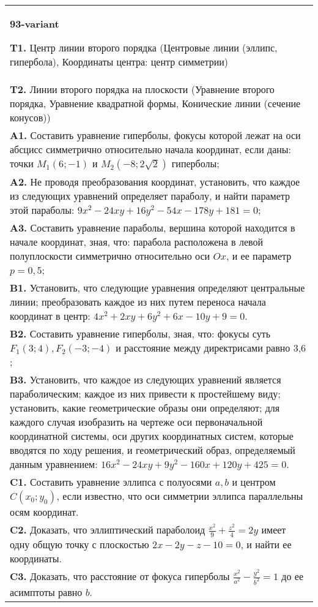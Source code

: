 \documentclass{article}
\begin{document}
\begin{tabular}{m{17cm}}
\textbf{93-variant}
\newline

\textbf{T1.} Центр линии второго порядка (Центровые линии (эллипс, гипербола), Координаты центра: центр симметрии) \\
\textbf{T2.} Линии второго порядка на плоскости (Уравнение второго порядка, Уравнение квадратной формы, Конические линии (сечение конусов)) \\
\textbf{A1.} Составить уравнение гиперболы, фокусы которой лежат на оси абсцисс симметрично относительно начала координат, если даны: точки $M_1(6 ;-1)$ и $M_2(-8 ; 2 \sqrt{2})$ гиперболы; \\
\textbf{A2.} Не проводя преобразования координат, установить, что каждое из следующих уравнений определяет параболу, и найти параметр этой параболы: $9 x^2-24 x y+16 y^2-54 x-178 y+181=0$; \\
\textbf{A3.} Составить уравнение параболы, вершина которой находится в начале координат, зная, что: парабола расположена в левой полуплоскости симметрично относительно оси $O x$, и ее параметр $p=0,5$; \\
\textbf{B1.} Установить, что следующие уравнения определяют центральные линии; преобразовать каждое из них путем переноса начала координат в центр: $4 x^2+2 x y+6 y^2+6 x-10 y+9=0$. \\
\textbf{B2.} Составить уравнение гиперболы, зная, что: фокусы суть $F_1(3 ; 4), F_2(-3 ;-4)$ и расстояние между директрисами равно 3,6 ; \\
\textbf{B3.} Установить, что каждое из следующих уравнений является параболическим; каждое из них привести к простейшему виду; установить, какие геометрические образы они определяют; для каждого случая изобразить на чертеже оси первоначальной координатной системы, оси других координатных систем, которые вводятся по ходу решения, и геометрический образ, определяемый данным уравнением: $16 x^2-24 x y+9 y^2-160 x+120 y+425=0$. \\
\textbf{C1.} Составить уравнение эллипса с полуосями $a, b$ и центром $C\left(x_0 ; y_0\right)$, если известно, что оси симметрии эллипса параллельны осям координат. \\
\textbf{C2.} Доказать, что эллиптический параболоид $\frac{x^2}{9}+\frac{z^2}{4}=2 y$ имеет одну общую точку с плоскостью $2 x-2 y-z-10=0$, и найти ее координаты. \\
\textbf{C3.} Доказать, что расстояние от фокуса гиперболы $\frac{x^2}{a^2}-\frac{y^2}{b^2}=1$ до ее асимптоты равно $b$. \\

\end{tabular}
\vspace{1cm}
\end{document}
